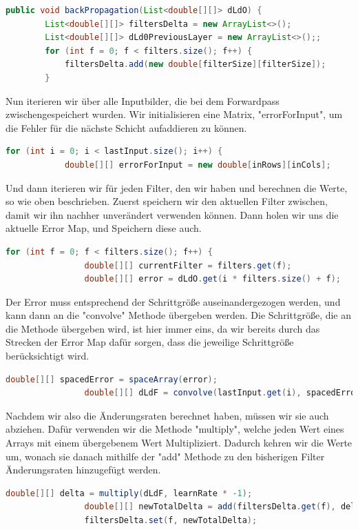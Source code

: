 \documentclass[12pt]{article}
\begin{document}
\begin{lstlisting}[language=Java]
public void backPropagation(List<double[][]> dLdO) {
        List<double[][]> filtersDelta = new ArrayList<>();
        List<double[][]> dLd0PreviousLayer = new ArrayList<>();;
        for (int f = 0; f < filters.size(); f++) {
            filtersDelta.add(new double[filterSize][filterSize]);
        }
\end{lstlisting}
Nun iterieren wir über alle Inputbilder, die bei dem Forwardpass zwischengespeichert wurden. Wir initialisieren eine Matrix, "errorForInput", um die Fehler für die nächste Schicht aufaddieren zu können.
\begin{lstlisting}[language=Java]
        for (int i = 0; i < lastInput.size(); i++) {
            double[][] errorForInput = new double[inRows][inCols];
\end{lstlisting}
Und dann iterieren wir für jeden Filter, den wir haben und berechnen die Werte, so wie oben beschrieben.
Zuerst speichern wir den aktuellen Filter zwischen, damit wir ihn nachher unverändert verwenden können. Dann holen wir uns die aktuelle Error Map, und Speichern diese auch.
\begin{lstlisting}[language=Java]
            for (int f = 0; f < filters.size(); f++) {
                double[][] currentFilter = filters.get(f);
                double[][] error = dLdO.get(i * filters.size() + f);
\end{lstlisting}
Der Error muss entsprechend der Schrittgröße auseinandergezogen werden, und kann dann an die "convolve" Methode übergeben werden. Die Schrittgröße, die an die Methode übergeben wird, ist hier immer eins, da wir bereits durch das Strecken der Error Map dafür sorgen, dass die jeweilige Schrittgröße berücksichtigt wird.
\begin{lstlisting}[language=Java]
                double[][] spacedError = spaceArray(error);
                double[][] dLdF = convolve(lastInput.get(i), spacedError, 1);
\end{lstlisting}
Nachdem wir also die Änderungsraten berechnet haben, müssen wir sie auch abziehen. Dafür verwenden wir die Methode "multiply", welche jeden Wert eines Arrays mit einem übergebenem Wert Multipliziert. Dadurch kehren wir die Werte um, wonach sie danach mithilfe der "add" Methode zu den bisherigen Filter Änderungsraten hinzugefügt werden.
\begin{lstlisting}[language=Java]
                double[][] delta = multiply(dLdF, learnRate * -1);
                double[][] newTotalDelta = add(filtersDelta.get(f), delta);
                filtersDelta.set(f, newTotalDelta);
\end{lstlisting}
\end{document}
